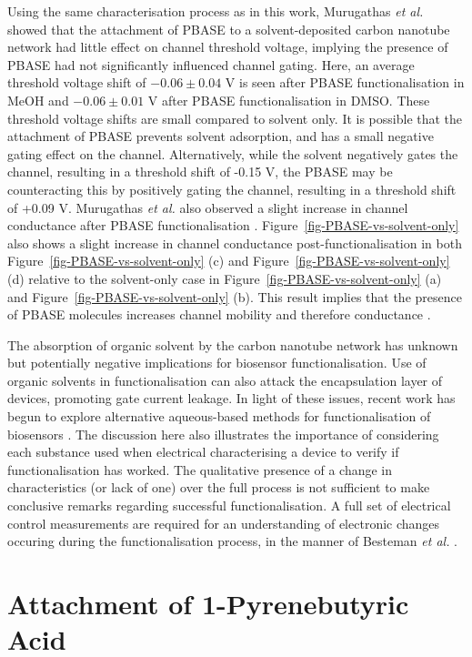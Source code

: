 \documentclass[
  a4paper,
]{scrbook}
\begin{document}
Using the same characterisation process as in this work, Murugathas
\emph{et al.} \autocite{Murugathas2019a} showed that the attachment of
PBASE to a solvent-deposited carbon nanotube network had little effect
on channel threshold voltage, implying the presence of PBASE had not
significantly influenced channel gating. Here, an average threshold
voltage shift of \(-0.06\pm0.04\) V is seen after PBASE
functionalisation in MeOH and \(-0.06\pm0.01\) V after PBASE
functionalisation in DMSO. These threshold voltage shifts are small
compared to solvent only. It is possible that the attachment of PBASE
prevents solvent adsorption, and has a small negative gating effect on
the channel. Alternatively, while the solvent negatively gates the
channel, resulting in a threshold shift of -0.15 V, the PBASE may be
counteracting this by positively gating the channel, resulting in a
threshold shift of +0.09 V. Murugathas \emph{et al.} also observed a
slight increase in channel conductance after PBASE functionalisation
\autocite{Murugathas2019a}. Figure~\ref{fig-PBASE-vs-solvent-only} also
shows a slight increase in channel conductance post-functionalisation in
both Figure~\ref{fig-PBASE-vs-solvent-only} (c) and
Figure~\ref{fig-PBASE-vs-solvent-only} (d) relative to the solvent-only
case in Figure~\ref{fig-PBASE-vs-solvent-only} (a) and
Figure~\ref{fig-PBASE-vs-solvent-only} (b). This result implies that the
presence of PBASE molecules increases channel mobility and therefore
conductance \autocite{Heller2008}.

The absorption of organic solvent by the carbon nanotube network has
unknown but potentially negative implications for biosensor
functionalisation. Use of organic solvents in functionalisation can also
attack the encapsulation layer of devices, promoting gate current
leakage. In light of these issues, recent work has begun to explore
alternative aqueous-based methods for functionalisation of biosensors
\autocite{Khan2021}. The discussion here also illustrates the importance
of considering each substance used when electrical characterising a
device to verify if functionalisation has worked. The qualitative
presence of a change in characteristics (or lack of one) over the full
process is not sufficient to make conclusive remarks regarding
successful functionalisation. A full set of electrical control
measurements are required for an understanding of electronic changes
occuring during the functionalisation process, in the manner of Besteman
\emph{et al.} \autocite{Besteman2003}.

\hypertarget{sec-PBA}{%
\section{Attachment of 1-Pyrenebutyric Acid}\label{sec-PBA}}
\end{document}
